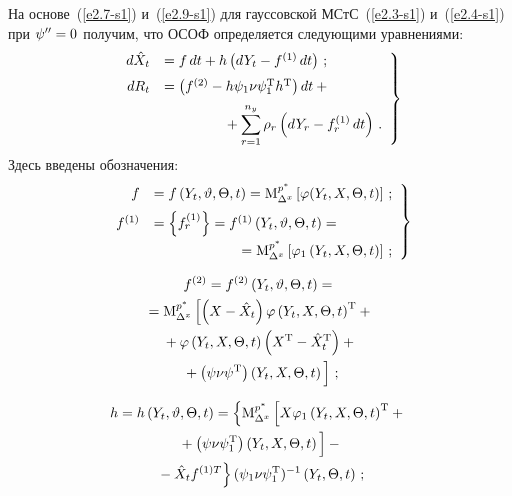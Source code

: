 \begin{multicols}{2}
На основе~(\ref{e2.7-s1}) и~(\ref{e2.9-s1}) для  гауссовской 
МСтС~(\ref{e2.3-s1}) и~(\ref{e2.4-s1}) при  $\psi''\hm=0$ получим, что 
ОСОФ определяется следующими уравнениями:
\begin{equation}
\left.
\begin{array}{rl}
d\hat X_t&=f\,dt + h     \left(dY_t- f^{(1)} \,dt\right)\,; %
\\[6pt]
dR_t&= \left(f^{(2)} -h\psi_1\nu\psi_1^{\mathrm{T}} h^{\mathrm{T}}\right) dt +{}\\[6pt]
&\hspace*{15mm}\displaystyle{}+\sss_{r=1}^{n_y} \rho_r \left(dY_r -f_r^{(1)}\, dt\right)\,.
\end{array}
\right\}
\label{e3.4-s1}
\end{equation}
Здесь введены обозначения:
    \begin{equation}
    \left.
    \begin{array}{rl}
    f&= f\left(Y_t,\vartheta,\Theta, t\right)=\mm_{\Delta^x}^{p^*} 
    \left[\varphi(Y_t,X,\Theta,t)\right]\,;
\\[6pt]
f^{(1)}&= \lf f_r^{(1)}\rf= f^{(1)}\left(Y_t,\vartheta,\Theta, t\right)={}\\[6pt]
&\hspace*{21mm}{}=
    \mm_{\Delta^x}^{p^*}  \lk\varphi_1\left(Y_t,X,\Theta,t\right)\rk\,;
    \end{array}
    \right\}
    \label{e3.5a-s1}
\end{equation}

\vspace*{-12pt}

\noindent
   \begin{multline}
f^{(2)}= f^{(2)}\left(Y_t,\vartheta,\Theta,t\right)={}\\
{}=
    \mathrm{M}_{\Delta^x}^{p^*} \left[ \left(X-\hat X_t\right)\varphi
    \left(Y_t,X,\Theta,t\right)^{\mathrm{T}}+{}\right.\\
{}+\varphi\left(Y_t,X,\Theta,t\right) 
\left(X^{\mathrm{T}}-\hat X_t^{\mathrm{T}}\right)
 + {}\\
\left. {}+\left(\psi\nu\psi^{\mathrm{T}}\right) \left(Y_t,X,\Theta,t\right)
\vphantom{\hat X \left(Y-t\Theta\right)^T}
\right] \,;
\label{e3.5b-s1}
 \end{multline}
 
 \vspace*{-12pt}
 
 \noindent
  \begin{multline}
h= h\left(Y_t,\vartheta,\Theta,t\right)=\left\{
    \mathrm{M}_{\Delta^x}^{p^*} \left[ X\varphi_1\left(Y_t,X,\Theta,t\right)^{\mathrm{T}}+{}\right.\right.\\
\left.{}+ \left(\psi\nu\psi_1^{\mathrm{T}}\right) 
\left(Y_t,X,\Theta,t\right)
\vphantom{\hat X \left(Y-t\Theta\right)^T}
\right]-{}\\
\left.{}-
    \hat X_t f^{(1)T}\right\} (\psi_1\nu\psi_1^{\mathrm{T}})^{-1} \left(Y_t,\Theta,t\right)\,;
    \label{e3.5c-s1}
    \end{multline}
    


\end{multicols}
